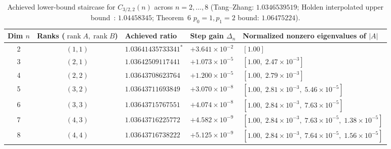 \documentclass[10pt,letterpaper]{article}
\newcommand{\rank}{\operatorname{rank}}
\begin{document}
\begin{table}[H]
\centering
\caption{\small Achieved lower-bound staircase for $C_{3/2,2}(n)$ across $n = 2,\dots,8$ (Tang--Zhang: $1.0346539519$; Holden interpolated upper bound~\cite{Holden2026b}: $1.04458345$; Theorem~6 $p_0=1, p_1=2$ bound: $1.06475224$).}
\vspace{3pt}
\footnotesize
\begin{tabular}{@{}c c l l l@{}}
\toprule
\textbf{Dim $n$} & \textbf{Ranks ($\rank A, \rank B$)} & \textbf{Achieved ratio} & \textbf{Step gain $\Delta_n$} & \textbf{Normalized nonzero eigenvalues of $|A|$} \\
\midrule
2 & $(1,1)$ & $1.03641435733341^*$ & $+3.641\times 10^{-2}$ & $[1.00]$ \\
3 & $(2,1)$ & $1.03642509117441$   & $+1.073\times 10^{-5}$ & $[1.00,\; 2.47\times 10^{-3}]$ \\
4 & $(2,2)$ & $1.03643708623764$   & $+1.200\times 10^{-5}$ & $[1.00,\; 2.79\times 10^{-3}]$ \\
5 & $(3,2)$ & $1.03643711693849$   & $+3.070\times 10^{-8}$ & $[1.00,\; 2.81\times 10^{-3},\; 5.46\times 10^{-5}]$ \\
6 & $(3,3)$ & $1.03643715767551$   & $+4.074\times 10^{-8}$ & $[1.00,\; 2.84\times 10^{-3},\; 7.63\times 10^{-5}]$ \\
7 & $(4,3)$ & $1.03643716225772$   & $+4.582\times 10^{-9}$ & $[1.00,\; 2.84\times 10^{-3},\; 7.63\times 10^{-5},\; 1.38\times 10^{-5}]$ \\
8 & $(4,4)$ & $1.03643716738222$   & $+5.125\times 10^{-9}$ & $[1.00,\; 2.84\times 10^{-3},\; 7.64\times 10^{-5},\; 1.56\times 10^{-5}]$ \\
\bottomrule
\end{tabular}
\label{tab:p32}
\end{table}
\end{document}
